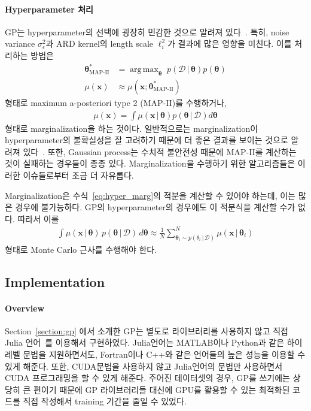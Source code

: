 \documentclass[ba, 11pt]{imsart}
\newcommand{\vx}{\mathbf{x}}
\newcommand{\vtheta}{\pmb{\theta}}
\DeclareMathOperator*{\argmax}{arg\,max}
\begin{document}
\paragraph{Hyperparameter 처리}
GP는 hyperparameter의 선택에 굉장히 민감한 것으로 알려져 있다~\citep{rasmussen_gaussian_2006}.
특히, noise variance \(\sigma^2_{\epsilon}\)과 ARD kernel의 length scale \(\ell_i^2\)가 결과에 많은 영향을 미친다.
이를 처리하는 방법은  
\begin{align}
  \vtheta^*_{\text{MAP-II}} &= \argmax_{\vtheta}\; p(\mathcal{D} \,|\, \vtheta) p(\vtheta) \\
  \mu(\vx) &\approx \mu(\vx;  \vtheta^*_{\text{MAP-II}})
\end{align}
형태로 maximum a-posteriori type 2 (MAP-II)를 수행하거나, 
\begin{align}
  \mu(\vx) = \int \mu(\vx \,|\, \vtheta) p(\vtheta \,|\, \mathcal{D}) d\vtheta\label{eq:hyper_marg}
\end{align}
형태로 marginalization을 하는 것이다.
일반적으로는 marginalization이 hyperparameter의 불확실성을 잘 고려하기 때문에 더 좋은 결과를 보이는 것으로 알려져 있다~\cite{murphy_machine_2012}.
또한, Gaussian process는 수치적 불안전성 때문에 MAP-II를 계산하는 것이 실패하는 경우들이 종종 있다.
Marginalization을 수행하기 위한 알고리즘들은 이러한 이슈들로부터 조금 더 자유롭다.

Marginalization은 수식~\eqref{eq:hyper_marg}의 적분을 계산할 수 있어야 하는데, 이는 많은 경우에 불가능하다.
GP의 hyperparameter의 경우에도 이 적분식을 계산할 수가 없다.
따라서 이를 
\begin{align}
  \int \mu(\vx \,|\, \vtheta) \, p(\vtheta \,|\, \mathcal{D}) \, d\vtheta \approx \frac{1}{N} \sum_{\vtheta_i \sim p(\theta_i \,|\, \mathcal{D})}^N \mu(\vx \,|\, \vtheta_i) \label{eq:mc}
\end{align}
형태로 Monte Carlo 근사를 수행해야 한다.

\subsection{Implementation}\label{}
\paragraph{Overview}
Section~\ref{section:gp} 에서 소개한 GP는 별도로 라이브러리를 사용하지 않고 직접 Julia 언어~\citep{bezanson_julia_2017}를 이용해서 구현하였다.
Julia언어는 MATLAB이나 Python과 같은 하이레벨 문법을 지원하면서도, Fortran이나 C++와 같은 언어들의 높은 성능을 이용할 수 있게 해준다.
또한, CUDA문법을 사용하지 않고 Julia언어의 문법만 사용하면서 CUDA 프로그래밍을 할 수 있게 해준다.
주어진 데이터셋의 경우, GP를 쓰기에는 상당히 큰 편이기 때문에 GP 라이브러리들 대신에 GPU를 활용할 수 있는 최적화된 코드를 직접 작성해서 training 기간을 줄일 수 있었다.
\end{document}
